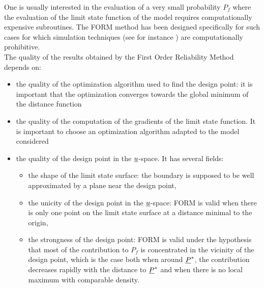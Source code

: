 {
  One is usually interested in the evaluation of a very small probability $P_f$ where the evaluation of the limit state function of the model requires computationally expensive subroutines. The FORM method has been designed specifically for such cases for which simulation techniques (see for instance ) are computationally prohibitive.\\

  The quality of the results obtained by the First Order Reliability Method depends on:
  \begin{itemize}
  \item the quality of the optimization algorithm used to find the design point: it is important that the optimization converges towards the global minimum of the distance function %
  \item the quality of the computation of the gradients of the limit state function. It is important to choose an optimization algorithm adapted to the model considered %
  \item the quality of the design point in the ${\underline{u}}$-space. It has several fields:
    \begin{itemize}
    \item the shape of the limit state surface: the boundary is supposed to be well approximated        by a plane near the design point,
    \item the unicity of the design point in the ${\underline{u}}$-space: FORM is valid when there is only one point on the limit state surface at a distance minimal to the origin,
    \item the strongness of the design point: FORM is valid under the hypothesis that most of the contribution to $P_f$ is concentrated in the vicinity of the design point, which is the case both when around ${\underline{P}}^*$, the contribution decreases rapidly with the distance to ${\underline{P}}^*$ and when there is no local maximum with comparable density.
    \end{itemize}


\end{itemize}}
